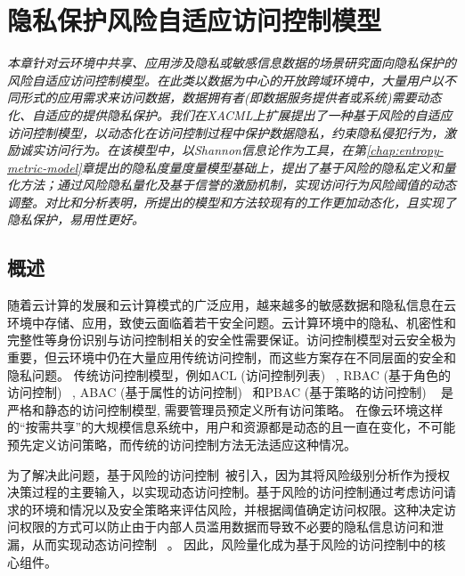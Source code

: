 \chapter{隐私保护风险自适应访问控制模型}
\label{chap:RaBAC-for-privacy}

\textit{ }

\textit{本章针对云环境中共享、应用涉及隐私或敏感信息数据的场景研究面向隐私保护的风险自适应访问控制模型。在此类以数据为中心的开放跨域环境中，大量用户以不同形式的应用需求来访问数据，数据拥有者(即数据服务提供者或系统)需要动态化、自适应的提供隐私保护。我们在XACML上扩展提出了一种基于风险的自适应访问控制模型，以动态化在访问控制过程中保护数据隐私，约束隐私侵犯行为，激励诚实访问行为。在该模型中，以Shannon信息论作为工具，在第\ref{chap:entropy-metric-model}章提出的隐私度量度量模型基础上，提出了基于风险的隐私定义和量化方法；通过风险隐私量化及基于信誉的激励机制，实现访问行为风险阈值的动态调整。对比和分析表明，所提出的模型和方法较现有的工作更加动态化，且实现了隐私保护，易用性更好。
}
\section{概述}
\label{sec:intro}
随着云计算的发展和云计算模式的广泛应用，越来越多的敏感数据和隐私信息在云环境中存储、应用，致使云面临着若干安全问题。云计算环境中的隐私、机密性和完整性等身份识别与访问控制相关的安全性需要保证。访问控制模型对云安全极为重要，但云环境中仍在大量应用传统访问控制，而这些方案存在不同层面的安全和隐私问题。
传统访问控制模型，例如ACL (访问控制列表) ~\cite{qian2001acla}, RBAC (基于角色的访问控制) ~\cite{jung2012cribac}, ABAC (基于属性的访问控制) ~\cite{zhang2011attribute}和PBAC (基于策略的访问控制) ~\cite{huang2011policy} 是严格和静态的访问控制模型, 需要管理员预定义所有访问策略。 在像云环境这样的“按需共享”的大规模信息系统中，用户和资源都是动态的且一直在变化，不可能预先定义访问策略，而传统的访问控制方法无法适应这种情况。

为了解决此问题，基于风险的访问控制~\cite{ni2010risk,shaikh2012dynamic,wang2011quantified,choi2015framework}被引入，因为其将风险级别分析作为授权决策过程的主要输入，以实现动态访问控制。基于风险的访问控制通过考虑访问请求的环境和情况以及安全策略来评估风险，并根据阈值确定访问权限。这种决定访问权限的方式可以防止由于内部人员滥用数据而导致不必要的隐私信息访问和泄漏，从而实现动态访问控制 ~\cite{chen2011risk}。 因此，风险量化成为基于风险的访问控制中的核心组件。

